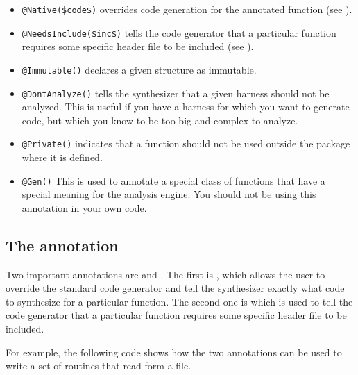 \begin{itemize}
\item \lstinline!@Native($code$)! overrides code generation for the annotated function (see ).
\item \lstinline!@NeedsInclude($inc$)!  tells the code generator that a particular function requires some specific header file to be included (see ).
\item \lstinline!@Immutable()! declares a given structure as immutable.
\item \lstinline!@DontAnalyze()! tells the synthesizer that a given harness should not be analyzed. This is useful if you have a harness for which you want to generate code, but which you know to be too big and complex to analyze.
\item \lstinline!@Private()! indicates that a function should not be used outside the package where it is defined.
\item \lstinline!@Gen()! This is used to annotate a special class of functions that have a special meaning for the analysis engine. You should not be using this annotation in your own code.
\end{itemize}




\subsection{The  annotation}

Two important annotations are  and . The first is , which allows the user to override the standard code generator and tell the synthesizer exactly what code to synthesize for a particular function. The second one is  which is used to tell the code generator that a particular function requires some specific header file to be included.

For example, the following code shows how the two  annotations can be used to write a set of routines that read form a file.

